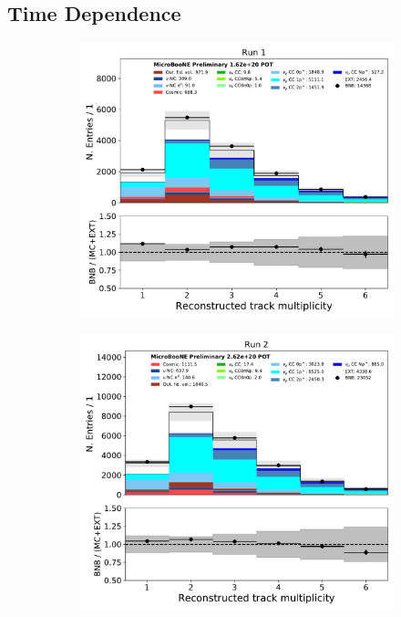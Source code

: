 \subsection{Time Dependence}
\label{ssec:Appendix:numu:timedep}
\begin{figure}[H] 
\begin{center}
    \begin{subfigure}[b]{0.35\textwidth}
        \centering
        \includegraphics[width=1.00\textwidth]{NuMuCCsel/Images/Ryan/Run1/reco_ntrack_08052020_full_samples_longest_noCRT_event_category.pdf}
    \end{subfigure}
    \begin{subfigure}[b]{0.35\textwidth}
        \centering
        \includegraphics[width=1.00\textwidth]{NuMuCCsel/Images/Ryan/Run2/reco_ntrack_08052020_full_samples_longest_noCRT_event_category.pdf}

\end{subfigure}
\end{center}
\end{figure}
